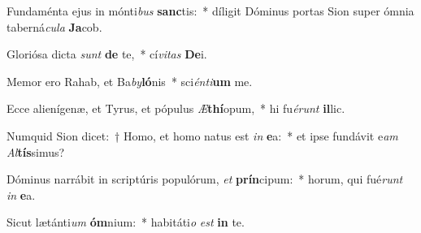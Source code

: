 \item Fundaménta ejus in mónti\textit{bus} \textbf{sanc}tis:~* díligit Dóminus portas Sion super ómnia taberná\textit{cu}\textit{la} \textbf{Ja}cob.
\item Gloriósa dicta \textit{sunt} \textbf{de} te,~* cí\textit{vi}\textit{tas} \textbf{De}i.
\item Memor ero Rahab, et Ba\textit{by}\textbf{ló}nis~* sci\textit{én}\textit{ti}\textbf{um} me.
\item Ecce alienígenæ, et Tyrus, et pópulus \textit{Æ}\textbf{thí}opum,~* hi fu\textit{é}\textit{runt} \textbf{il}lic.
\item Numquid Sion dicet:~† Homo, et homo natus est \textit{in} \textbf{e}a:~* et ipse fundávit e\textit{am} \textit{Al}\textbf{tís}simus?
\item Dóminus narrábit in scriptúris populórum, \textit{et} \textbf{prín}cipum:~* horum, qui fué\textit{runt} \textit{in} \textbf{e}a.
\item Sicut lætánti\textit{um} \textbf{óm}nium:~* habitáti\textit{o} \textit{est} \textbf{in} te.
